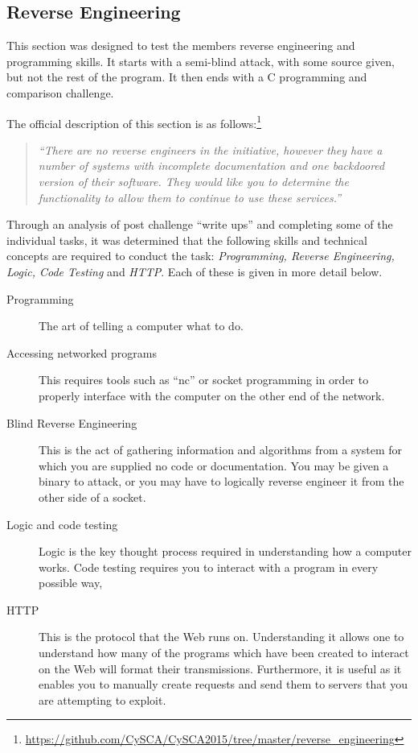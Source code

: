 \documentclass[a4paper,11pt]{report}
\begin{document}
		\subsection{Reverse Engineering}
			This section was designed to test the members reverse engineering and programming skills. 
			It starts with a semi-blind attack, with some source given, but not the rest of the program. 
			It then ends with a C programming and comparison challenge. 
			
			The official description of this section is as follows:\footnote{\url{https://github.com/CySCA/CySCA2015/tree/master/reverse\_engineering}}
			\begin{quote}
				\textit{``There are no reverse engineers in the initiative, however they have a number of systems with incomplete documentation and one backdoored version of their software. They would like you to determine the functionality to allow them to continue to use these services.''}
			\end{quote}

			Through an analysis of post challenge ``write ups'' and completing some of the individual tasks, 
			it was determined that the following skills and technical concepts are required to conduct the task: 
			\textit{Programming, Reverse Engineering, Logic, Code Testing} and \textit{HTTP}.
			Each of these is given in more detail below. 
			\begin{description}
				\item[Programming]
					The art of telling a computer what to do. 
				\item[Accessing networked programs] 
					This requires tools such as ``nc'' or socket programming in order to properly interface with the computer on the other end of the network. 
				\item[Blind Reverse Engineering] 
					This is the act of gathering information and algorithms from a system for which you are supplied no code or documentation. 
					You may be given a binary to attack, or you may have to logically reverse engineer it from the other side of a socket. 
				\item[Logic and code testing] 
					Logic is the key thought process required in understanding how a computer works. 
					Code testing requires you to interact with a program in every possible way, 
				\item[HTTP] 
					This is the protocol that the Web runs on. 
					Understanding it allows one to understand how many of the programs which have been created to interact on the Web will format their transmissions. 
					Furthermore, it is useful as it enables you to manually create requests and send them to servers that you are attempting to exploit. 
			\end{description}
\end{document}
